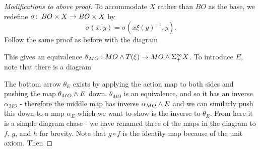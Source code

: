 \begin{proof}[Modifications to above proof]
To accommodate $X$ rather than $BO$ as the base, we redefine $\sigma\colon\thinspace BO \times X \to BO \times X$ by \[\sigma(x, y) = \sigma(x \xi(y)^{-1}, y).\]  Follow the same proof as before with the diagram
\begin{center}
\end{center}
This gives an equivalence $\theta_{MO}: MO \wedge T(\xi) \rightarrow MO \wedge \Sigma^\infty_+ X$.  To introduce $E$, note that there is a diagram
\begin{center}
\end{center}
The bottom arrow $\theta_E$ exists by applying the action map to both sides and pushing the map $\theta_{MO} \wedge E$ down.  $\theta_{MO}$ is an equivalence, and so it has an inverse $\alpha_{MO}$ - therefore the middle map has inverse $\alpha_{MO} \wedge E$ and we can similarly push this down to a map $\alpha_E$ which we want to show is the inverse to $\theta_E$.  From here it is a simple diagram chase - we have renamed three of the maps in the diagram to $f$, $g$, and $h$ for brevity.  Note that $g \circ f$ is the identity map because of the unit axiom.  Then


\end{proof}
